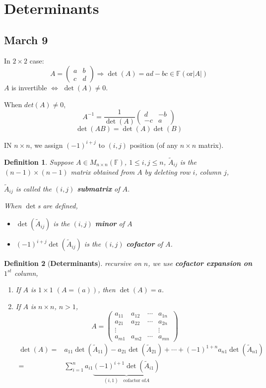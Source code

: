 \documentclass[12pt]{article}
\theoremstyle{plain}
\newtheorem{definition}{Definition}[subsection]
\newcommand{\mF}{{\mathbb{F}}}
\begin{document}
\section{Determinants}
\subsection{March 9}
In $2\times 2$ case:
\[
	A =
	\begin{pmatrix}
		a & b	\\
		c & d	
	\end{pmatrix}
	\Rightarrow
	\det (A) = ad - bc \in \mF (\text{or} |A|)
\]
$A$ is invertible $\iff$ $\det(A) \neq 0$. 

When $det(A) \neq 0$, 
\[
	A^{-1} = \frac1{\det(A)} 
	\begin{pmatrix}
		d & -b	\\
		-c & a
	\end{pmatrix}
\]
\[
	\det(AB) = \det(A)\det(B)
\]


IN $n\times n$,
we assign $(-1)^{i+j}$ to $(i,j)$ position (of any $n\times n$ matrix). 

\begin{definition}
	Suppose $A \in M_{n\times n}(\mF)$, $1\leq i, j \leq n$, 
	$\tilde A_{ij}$ is the $(n-1)\times(n-1)$ matrix obtained from
			$A$ by deleting row $i$, column $j$, 

	$\tilde A_{ij}$ is called the $(i,j)$ \textbf{submatrix} of $A$.

	When $\det$s are defined, 
	\begin{itemize}
		\item $\det(\tilde A_{ij})$ is the $(i,j)$ \textbf{minor} of $A$
		\item $(-1)^{i+j} \det(\tilde A_{ij})$ is the $(i,j)$ \textbf{cofactor}
			of $A$.		\\
	\end{itemize}
\end{definition}

\begin{definition}[\textbf{Determinants}]
	recursive on $n$, we use \textbf{cofactor expansion on $1^{st}$} column,
	\begin{enumerate}
		\item If $A$ is $1\times 1$ $(A = (a))$, then $\det(A) = a$.
		\item If $A$ is $n\times n$, $n > 1$, 
			\[
				A = 
				\begin{pmatrix}
					a_{11} & a_{12} & \cdots & a_{1n}	\\
					a_{21} & a_{22} & \cdots & a_{2n}	\\
					\vdots &		&		 & \vdots	\\
					a_{m1} & a_{m2} & \cdots & a_{mn}	
				\end{pmatrix}
			\]
			\begin{align*}
				\det(A) 
				=& a_{11} \det(\tilde A_{11}) - a_{21} \det(\tilde A_{21})
				+ \cdots + (-1)^{1+n} a_{n1} \det(\tilde A_{n1})	\\
				=& \sum_{i=1}^n a_{i1} 
				\underbrace{(-1)^{i+1} \det(\tilde A_{i1})}_{(i,1) \quad
				\text{cofactor of} A}
			\end{align*}
	\end{enumerate}
\end{definition}
\end{document}
